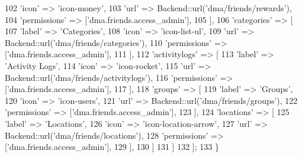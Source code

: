 \begin{DoxyCode}
102                         \textcolor{stringliteral}{'icon'}          => \textcolor{stringliteral}{'icon-money'},
103                         \textcolor{stringliteral}{'url'}           => Backend::url(\textcolor{stringliteral}{'dma/friends/rewards'}),
104                         \textcolor{stringliteral}{'permissions'}   => [\textcolor{stringliteral}{'dma.friends.access\_admin'}],
105                     ],
106                     \textcolor{stringliteral}{'categories'} => [
107                         \textcolor{stringliteral}{'label'}         => \textcolor{stringliteral}{'Categories'},
108                         \textcolor{stringliteral}{'icon'}          => \textcolor{stringliteral}{'icon-list-ul'},
109                         \textcolor{stringliteral}{'url'}           => Backend::url(\textcolor{stringliteral}{'dma/friends/categories'}),
110                         \textcolor{stringliteral}{'permissions'}   => [\textcolor{stringliteral}{'dma.friends.access\_admin'}],
111                     ],  
112                     \textcolor{stringliteral}{'activitylogs'}   => [
113                         \textcolor{stringliteral}{'label'}         => \textcolor{stringliteral}{'Activity Logs'},
114                         \textcolor{stringliteral}{'icon'}          => \textcolor{stringliteral}{'icon-rocket'},
115                         \textcolor{stringliteral}{'url'}           => Backend::url(\textcolor{stringliteral}{'dma/friends/activitylogs'}),
116                         \textcolor{stringliteral}{'permissions'}   => [\textcolor{stringliteral}{'dma.friends.access\_admin'}],
117                     ],
118                     \textcolor{stringliteral}{'groups'}   => [
119                         \textcolor{stringliteral}{'label'}         => \textcolor{stringliteral}{'Groups'},
120                         \textcolor{stringliteral}{'icon'}          => \textcolor{stringliteral}{'icon-users'},
121                         \textcolor{stringliteral}{'url'}           => Backend::url(\textcolor{stringliteral}{'dma/friends/groups'}),
122                         \textcolor{stringliteral}{'permissions'}   => [\textcolor{stringliteral}{'dma.friends.access\_admin'}],
123                     ],
124                     \textcolor{stringliteral}{'locations'} => [
125                         \textcolor{stringliteral}{'label'}         => \textcolor{stringliteral}{'Locations'},
126                         \textcolor{stringliteral}{'icon'}          => \textcolor{stringliteral}{'icon-location-arrow'},
127                         \textcolor{stringliteral}{'url'}           => Backend::url(\textcolor{stringliteral}{'dma/friends/locations'}),
128                         \textcolor{stringliteral}{'permissions'}   => [\textcolor{stringliteral}{'dma.friends.access\_admin'}],
129                     ],                
130                 ]
131             ]
132         ];
133     \}
\end{DoxyCode}
\hypertarget{classDMA_1_1Friends_1_1Plugin_a1f5f007ec6f0f3f16516cf1a2e19d296}{}
